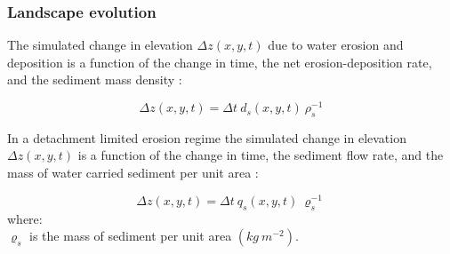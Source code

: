 \documentclass[final,3p,times,twocolumn]{elsarticle}
\begin{document}


\subsubsection{Landscape evolution}
The simulated change in elevation $\Delta z(x,y,t)$ due to water erosion and deposition
is a function of
the change in time, the net erosion-deposition rate, and the sediment mass density 
\cite{Mitasova2013}:

\begin{equation}
\label{eq:evolution} 
{\Delta z(x,y,t) = \Delta t ~ d_s(x,y,t) ~ \rho_s^{-1} }
\end{equation}


In a detachment limited erosion regime
the simulated change in elevation $\Delta z(x,y,t)$
is a function of
the change in time, the sediment flow rate, and the mass of water carried sediment per unit area
\cite{Mitasova2013}:

\begin{equation}
\label{eq:flux_evolution} 
{\Delta z(x,y,t) = \Delta t ~ q_s(x,y,t) ~ \varrho_s^{-1} } 
\end{equation}
%
{\small
\noindent
where: \\
\noindent
\hspace*{0.5em} $\varrho_s$ is the mass of sediment per unit area $(kg ~ m^{-2})$.\\
}
\end{document}
